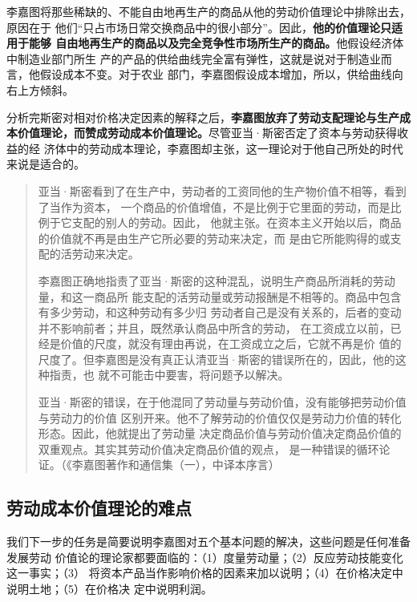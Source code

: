 李嘉图将那些稀缺的、不能自由地再生产的商品从他的劳动价值理论中排除出去，原因在于
他们“只占市场日常交换商品中的很小部分”。因此，\textbf{他的价值理论只适用于能够
  自由地再生产的商品以及完全竞争性市场所生产的商品。}他假设经济体中制造业部门所生
产的产品的供给曲线完全富有弹性，这就是说对于制造业而言，他假设成本不变。对于农业
部门，李嘉图假设成本增加，所以，供给曲线向右上方倾斜。

分析完斯密对相对价格决定因素的解释之后，\textbf{李嘉图放弃了劳动支配理论与生产成
  本价值理论，而赞成劳动成本价值理论。}尽管亚当·斯密否定了资本与劳动获得收益的经
济体中的劳动成本理论，李嘉图却主张，这一理论对于他自己所处的时代来说是适合的。

\begin{quotation}
  亚当·斯密看到了在生产中，劳动者的工资同他的生产物价值不相等，看到了当作为资本，
  一个商品的价值增值，不是比例于它里面的劳动，而是比例于它支配的别人的劳动。因此，
  他就主张。在资本主义开始以后，商品的价值就不再是由生产它所必要的劳动来决定，而
  是由它所能购得的或支配的活劳动来决定。

  李嘉图正确地指责了亚当·斯密的这种混乱，说明生产商品所消耗的劳动量，和这一商品所
  能支配的活劳动量或劳动报酬是不相等的。商品中包含有多少劳动，和这种劳动有多少归
  劳动者自己是没有关系的，后者的变动并不影响前者；并且，既然承认商品中所含的劳动，
  在工资成立以前，已经是价值的尺度，就没有理由再说，在工资成立之后，它就不再是价
  值的尺度了。但李嘉图是没有真正认清亚当·斯密的错误所在的，因此，他的这种指责，也
  就不可能击中要害，将问题予以解决。

  亚当·斯密的错误，在于他混同了劳动量与劳动价值，没有能够把劳动价值与劳动力的价值
  区别开来。他不了解劳动的价值仅仅是劳动力价值的转化形态。因此，他就提出了劳动量
  决定商品价值与劳动价值决定商品价值的双重观点。其实其劳动价值决定商品价值的观点，
  是一种错误的循环论证。（《李嘉图著作和通信集（一），中译本序言）
\end{quotation}

\subsection{劳动成本价值理论的难点}

我们下一步的任务是简要说明李嘉图对五个基本问题的解决，这些问题是任何准备发展劳动
价值论的理论家都要面临的：（1）度量劳动量；（2）反应劳动技能变化这一事实；（3）
将资本产品当作影响价格的因素来加以说明；（4）在价格决定中说明土地；（5）在价格决
定中说明利润。

